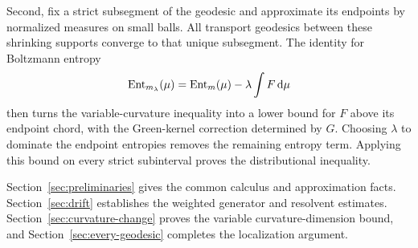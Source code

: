 Second, fix a strict subsegment of the geodesic and approximate its
endpoints by normalized measures on small balls. All transport
geodesics between these shrinking supports converge to that unique
subsegment. The identity for Boltzmann entropy
\[
\operatorname{Ent}_{m_\lambda}(\mu)
=\operatorname{Ent}_m(\mu)-\lambda\int F\,\mathrm d\mu
\]
then turns the variable-curvature inequality into a lower bound for
\(F\) above its endpoint chord, with the Green-kernel correction
determined by \(G\). Choosing \(\lambda\) to dominate the endpoint
entropies removes the remaining entropy term. Applying this bound
on every strict subinterval proves the distributional inequality.

Section~\ref{sec:preliminaries} gives the common calculus and
approximation facts. Section~\ref{sec:drift} establishes the weighted
generator and resolvent estimates. Section~\ref{sec:curvature-change}
proves the variable curvature-dimension bound, and
Section~\ref{sec:every-geodesic} completes the localization argument.
